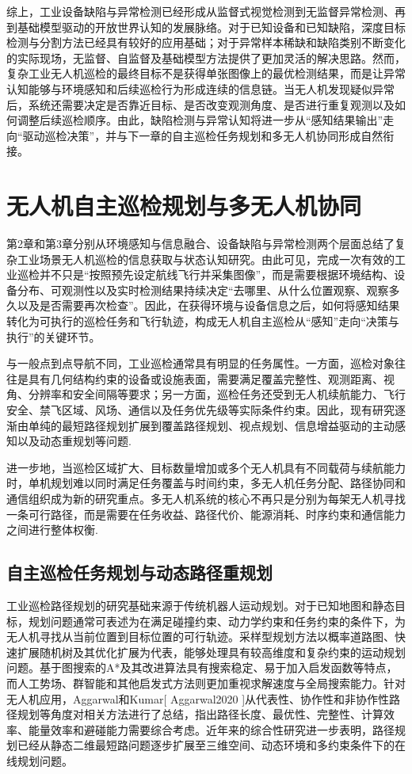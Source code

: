 综上，工业设备缺陷与异常检测已经形成从监督式视觉检测到无监督异常检测、再到基础模型驱动的开放世界认知的发展脉络。对于已知设备和已知缺陷，深度目标检测与分割方法已经具有较好的应用基础；对于异常样本稀缺和缺陷类别不断变化的实际现场，无监督、自监督及基础模型方法提供了更加灵活的解决思路。然而，复杂工业无人机巡检的最终目标不是获得单张图像上的最优检测结果，而是让异常认知能够与环境感知和后续巡检行为形成连续的信息链。当无人机发现疑似异常后，系统还需要决定是否靠近目标、是否改变观测角度、是否进行重复观测以及如何调整后续巡检顺序。由此，缺陷检测与异常认知将进一步从“感知结果输出”走向“驱动巡检决策”，并与下一章的自主巡检任务规划和多无人机协同形成自然衔接。


\section{无人机自主巡检规划与多无人机协同}

第2章和第3章分别从环境感知与信息融合、设备缺陷与异常检测两个层面总结了复杂工业场景无人机巡检的信息获取与状态认知研究。由此可见，完成一次有效的工业巡检并不只是“按照预先设定航线飞行并采集图像”，而是需要根据环境结构、设备分布、可观测性以及实时检测结果持续决定“去哪里、从什么位置观察、观察多久以及是否需要再次检查”。因此，在获得环境与设备信息之后，如何将感知结果转化为可执行的巡检任务和飞行轨迹，构成无人机自主巡检从“感知”走向“决策与执行”的关键环节。

与一般点到点导航不同，工业巡检通常具有明显的任务属性。一方面，巡检对象往往是具有几何结构约束的设备或设施表面，需要满足覆盖完整性、观测距离、视角、分辨率和安全间隔等要求；另一方面，巡检任务还受到无人机续航能力、飞行安全、禁飞区域、风场、通信以及任务优先级等实际条件约束。因此，现有研究逐渐由单纯的最短路径规划扩展到覆盖路径规划、视点规划、信息增益驱动的主动感知以及动态重规划等问题\cite{Aggarwal2020,Kumar2023}.

进一步地，当巡检区域扩大、目标数量增加或多个无人机具有不同载荷与续航能力时，单机规划难以同时满足任务覆盖与时间约束，多无人机任务分配、路径协同和通信组织成为新的研究重点。多无人机系统的核心不再只是分别为每架无人机寻找一条可行路径，而是需要在任务收益、路径代价、能源消耗、时序约束和通信能力之间进行整体权衡\cite{Skaltsis2023,Chakraa2023}.

\subsection{自主巡检任务规划与动态路径重规划}

工业巡检路径规划的研究基础来源于传统机器人运动规划。对于已知地图和静态目标，规划问题通常可表述为在满足碰撞约束、动力学约束和任务约束的条件下，为无人机寻找从当前位置到目标位置的可行轨迹。采样型规划方法以概率道路图、快速扩展随机树及其优化扩展为代表，能够处理具有较高维度和复杂约束的运动规划问题\cite{Kingston2018,Orthey2024}。基于图搜索的A*及其改进算法具有搜索稳定、易于加入启发函数等特点，而人工势场、群智能和其他启发式方法则更加重视求解速度与全局搜索能力。针对无人机应用，Aggarwal和Kumar[ Aggarwal2020 ]从代表性、协作性和非协作性路径规划等角度对相关方法进行了总结，指出路径长度、最优性、完整性、计算效率、能量效率和避碰能力需要综合考虑。近年来的综合性研究进一步表明，路径规划已经从静态二维最短路问题逐步扩展至三维空间、动态环境和多约束条件下的在线规划问题\cite{Kumar2025}。

